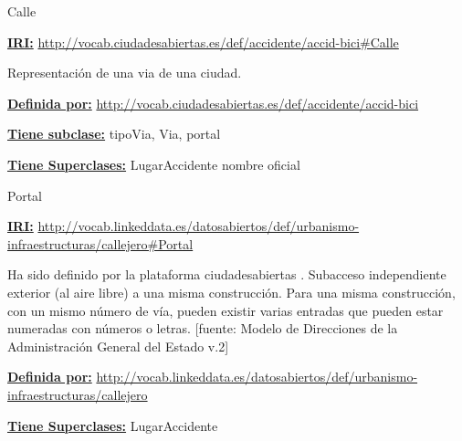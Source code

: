 \begin{mybox}{Calle}
\begin{flushleft}
\underline{\textbf{IRI:}}
\url{http://vocab.ciudadesabiertas.es/def/accidente/accid-bici#Calle}
\newline

Representación de una via de una ciudad.
\newline

\underline{\textbf{Definida por:}}
\url{http://vocab.ciudadesabiertas.es/def/accidente/accid-bici}
\newline

\underline{\textbf{Tiene subclase:}}
\newline tipoVia,\hspace{2em} Via,\hspace{2em} portal
\newline 

\underline{\textbf{Tiene Superclases:}}
\newline LugarAccidente \hspace{2em} nombre oficial

\end{flushleft}
\end{mybox}




\begin{mybox}{Portal}
\begin{flushleft}
\underline{\textbf{IRI:}}
\url{http://vocab.linkeddata.es/datosabiertos/def/urbanismo-infraestructuras/callejero#Portal}
\newline

Ha sido definido por la plataforma ciudadesabiertas \cite{datosabiertos_portal}.
Subacceso independiente exterior (al aire libre) a una misma construcción. Para una misma construcción, con un mismo número de vía, pueden existir varias entradas que pueden estar numeradas con números o letras. [fuente: Modelo de Direcciones de la Administración General del Estado v.2]
\newline

\underline{\textbf{Definida por:}}
\url{http://vocab.linkeddata.es/datosabiertos/def/urbanismo-infraestructuras/callejero}
\newline

\underline{\textbf{Tiene Superclases:}}
	LugarAccidente
\newline

\end{flushleft}
\end{mybox}



